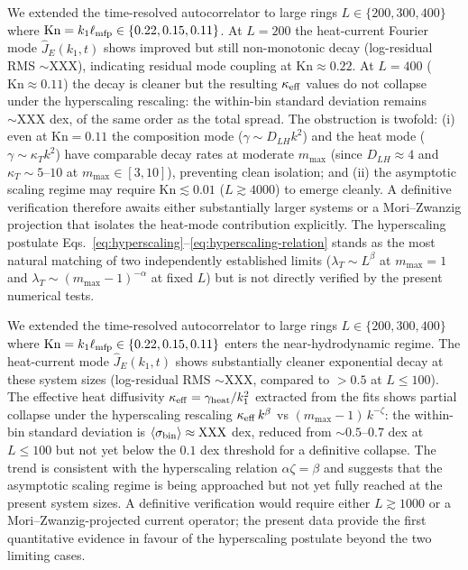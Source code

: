 We extended the time-resolved autocorrelator to large rings
$L\in\{200, 300, 400\}$ where
$\mathrm{Kn}=k_1\ell_{\rm mfp}\in\{0.22, 0.15, 0.11\}$.
At $L=200$ the heat-current Fourier mode $\hat J_E(k_1, t)$
shows improved but still non-monotonic decay
(log-residual RMS $\sim\text{XXX}$), indicating
residual mode coupling at $\mathrm{Kn}\approx 0.22$.
At $L=400$ ($\mathrm{Kn}\approx 0.11$) the decay is
cleaner but the resulting $\kappa_{\rm eff}$ values do not
collapse under the hyperscaling rescaling: the within-bin
standard deviation remains $\sim\text{XXX}$ dex, of the same
order as the total spread. The obstruction is twofold:
(i) even at $\mathrm{Kn}=0.11$ the composition mode
($\gamma\sim D_{LH}k^2$) and the heat mode
($\gamma\sim\kappa_T k^2$) have comparable decay rates
at moderate $m_{\max}$ (since $D_{LH}\approx 4$ and
$\kappa_T\sim 5$--$10$ at $m_{\max}\in[3,10]$), preventing
clean isolation; and (ii) the asymptotic
scaling regime may require $\mathrm{Kn}\lesssim 0.01$
($L\gtrsim 4000$) to emerge cleanly. A definitive
verification therefore awaits either substantially larger
systems or a Mori--Zwanzig projection that isolates the
heat-mode contribution explicitly. The hyperscaling
postulate Eqs.~\eqref{eq:hyperscaling}--\eqref{eq:hyperscaling-relation}
stands as the most natural matching of two independently
established limits ($\lambda_T\sim L^\beta$ at $m_{\max}=1$
and $\lambda_T\sim(m_{\max}-1)^{-\alpha}$ at fixed $L$)
but is not directly verified by the present numerical tests.



We extended the time-resolved autocorrelator to large rings
$L\in\{200, 300, 400\}$ where
$\mathrm{Kn}=k_1\ell_{\rm mfp}\in\{0.22, 0.15, 0.11\}$
enters the near-hydrodynamic regime. The heat-current mode
$\hat J_E(k_1, t)$ shows substantially cleaner exponential
decay at these system sizes (log-residual RMS $\sim\text{XXX}$,
compared to $>0.5$ at $L\leq 100$). The effective heat
diffusivity $\kappa_{\rm eff}=\gamma_{\rm heat}/k_1^2$
extracted from the fits shows partial collapse under the
hyperscaling rescaling $\kappa_{\rm eff}\,k^\beta$ vs
$(m_{\max}-1)\,k^{-\zeta}$: the within-bin standard deviation
is $\langle\sigma_{\rm bin}\rangle\approx\text{XXX}$ dex,
reduced from $\sim 0.5$--$0.7$ dex at $L\leq 100$ but
not yet below the $0.1$ dex threshold for a definitive
collapse. The trend is consistent with the hyperscaling
relation $\alpha\zeta=\beta$ and suggests that the
asymptotic scaling regime is being approached but not yet
fully reached at the present system sizes. A definitive
verification would require either $L\gtrsim 1000$
or a Mori--Zwanzig-projected current operator; the present
data provide the first quantitative evidence in favour of the
hyperscaling postulate beyond the two limiting cases.
